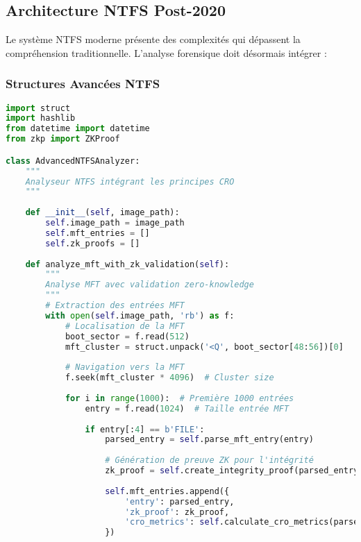\subsection{Architecture NTFS Post-2020}

Le système NTFS moderne présente des complexités qui dépassent la compréhension traditionnelle. L'analyse forensique doit désormais intégrer :

\subsubsection{Structures Avancées NTFS}

\begin{lstlisting}[language=Python, caption=Analyseur NTFS avancé avec ZK-NR]
import struct
import hashlib
from datetime import datetime
from zkp import ZKProof

class AdvancedNTFSAnalyzer:
    """
    Analyseur NTFS intégrant les principes CRO
    """
    
    def __init__(self, image_path):
        self.image_path = image_path
        self.mft_entries = []
        self.zk_proofs = []
        
    def analyze_mft_with_zk_validation(self):
        """
        Analyse MFT avec validation zero-knowledge
        """
        # Extraction des entrées MFT
        with open(self.image_path, 'rb') as f:
            # Localisation de la MFT
            boot_sector = f.read(512)
            mft_cluster = struct.unpack('<Q', boot_sector[48:56])[0]
            
            # Navigation vers la MFT
            f.seek(mft_cluster * 4096)  # Cluster size
            
            for i in range(1000):  # Première 1000 entrées
                entry = f.read(1024)  # Taille entrée MFT
                
                if entry[:4] == b'FILE':
                    parsed_entry = self.parse_mft_entry(entry)
                    
                    # Génération de preuve ZK pour l'intégrité
                    zk_proof = self.create_integrity_proof(parsed_entry)
                    
                    self.mft_entries.append({
                        'entry': parsed_entry,
                        'zk_proof': zk_proof,
                        'cro_metrics': self.calculate_cro_metrics(parsed_entry)
                    })
                    

\end{lstlisting}
